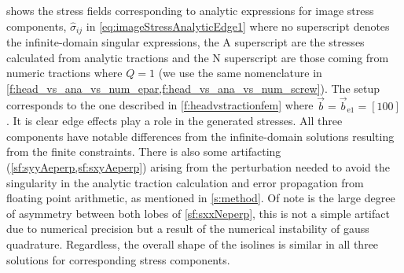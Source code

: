 \documentclass[11pt]{iopart}
\begin{document}
 shows the stress fields corresponding to analytic expressions for image stress components, $\hat{\sigma}_{ij}$ in \cref{eq:imageStressAnalyticEdge1} where no superscript denotes the infinite-domain singular expressions, the $\textrm{A}$ superscript are the stresses calculated from analytic tractions and the $\textrm{N}$ superscript are those coming from numeric tractions where $Q = 1$ (we use the same nomenclature in \cref{f:head_vs_ana_vs_num_epar,f:head_vs_ana_vs_num_screw}). The setup corresponds to the one described in \cref{f:headvstractionfem} where $\vec{b} = \vec{b}_{\textrm{e1}} = [1 0 0]$. It is clear edge effects play a role in the generated stresses. All three components have notable differences from the infinite-domain solutions resulting from the finite constraints. There is also some artifacting (\cref{sf:syyAeperp,sf:sxyAeperp}) arising from the perturbation needed to avoid the singularity in the analytic traction calculation and error propagation from floating point arithmetic, as mentioned in \cref{s:method}. Of note is the large degree of asymmetry between both lobes of \cref{sf:sxxNeperp}, this is not a simple artifact due to numerical precision but a result of the numerical instability of gauss quadrature. Regardless, the overall shape of the isolines is similar in all three solutions for corresponding stress components.
\end{document}
